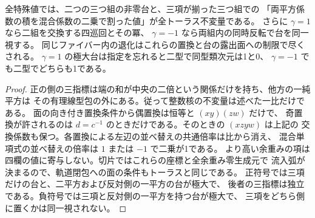\begin{corollary}
全特殊値では、二つの三つ組の非零台と、三項が揃った三つ組での
「両平方係数の積を混合係数の二乗で割った値」が全トーラス不変量である。
さらに $\gamma=1$ なら二組を交換する四巡回とその冪、
$\gamma=-1$ なら両組内の同時反転で台を同一視する。
同じファイバー内の退化はこれらの置換と台の露出面への制限で尽くされる。
$\gamma=1$ の極大台は指定を忘れると二型で同型類次元は1と0、
$\gamma=-1$ でも二型でどちらも1である。
\end{corollary}
\begin{proof}
正の側の三指標は端の和が中央の二倍という関係だけを持ち、他方の一純平方は
その有理線型包の外にある。従って整数核の不変量は述べた一比だけである。
面の向き付き置換条件から偶置換は恒等と $(xy)(zw)$ だけで、
奇置換が許されるのは $d=c^{-1}$ のときだけである。そのときの $(xzyw)$ は上記の
交換係数も保つ。各置換による左辺の並べ替えの共通倍率は比から消え、
混合単項式の並べ替えの倍率は $1$ または $-1$ で二乗が1である。
より高い余重みの項は四欄の値に寄与しない。切片ではこれらの座標と全余重み零生成元で
流入弧が決まるので、軌道閉包への面の条件もトーラスと同じである。
正符号では三項だけの台と、二平方および反対側の一平方の台が極大で、
後者の三指標は独立である。負符号では三項と反対側の一平方を持つ台が極大で、
三項をどちら側に置くかは同一視されない。
\end{proof}
